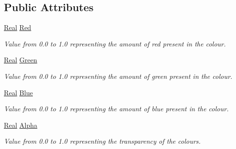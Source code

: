 \subsection*{Public Attributes}
\begin{DoxyCompactItemize}
\item 
\hypertarget{classphys_1_1ColourValue_a32b5411b9b87f92a6626f3f4d5f0a158}{
\hyperlink{namespacephys_af7eb897198d265b8e868f45240230d5f}{Real} \hyperlink{classphys_1_1ColourValue_a32b5411b9b87f92a6626f3f4d5f0a158}{Red}}
\label{d3/db0/classphys_1_1ColourValue_a32b5411b9b87f92a6626f3f4d5f0a158}

\begin{DoxyCompactList}\small\item\em Value from 0.0 to 1.0 representing the amount of red present in the colour. \item\end{DoxyCompactList}\item 
\hypertarget{classphys_1_1ColourValue_adea93a8cd64acc8b5fd1851b4460af00}{
\hyperlink{namespacephys_af7eb897198d265b8e868f45240230d5f}{Real} \hyperlink{classphys_1_1ColourValue_adea93a8cd64acc8b5fd1851b4460af00}{Green}}
\label{d3/db0/classphys_1_1ColourValue_adea93a8cd64acc8b5fd1851b4460af00}

\begin{DoxyCompactList}\small\item\em Value from 0.0 to 1.0 representing the amount of green present in the colour. \item\end{DoxyCompactList}\item 
\hypertarget{classphys_1_1ColourValue_a403503f979575b17d1873f031e8d7d75}{
\hyperlink{namespacephys_af7eb897198d265b8e868f45240230d5f}{Real} \hyperlink{classphys_1_1ColourValue_a403503f979575b17d1873f031e8d7d75}{Blue}}
\label{d3/db0/classphys_1_1ColourValue_a403503f979575b17d1873f031e8d7d75}

\begin{DoxyCompactList}\small\item\em Value from 0.0 to 1.0 representing the amount of blue present in the colour. \item\end{DoxyCompactList}\item 
\hypertarget{classphys_1_1ColourValue_a5fc5eceef739a91d7cc079767d712f52}{
\hyperlink{namespacephys_af7eb897198d265b8e868f45240230d5f}{Real} \hyperlink{classphys_1_1ColourValue_a5fc5eceef739a91d7cc079767d712f52}{Alpha}}
\label{d3/db0/classphys_1_1ColourValue_a5fc5eceef739a91d7cc079767d712f52}

\begin{DoxyCompactList}\small\item\em Value from 0.0 to 1.0 representing the transparency of the colours. \item\end{DoxyCompactList}\end{DoxyCompactItemize}



